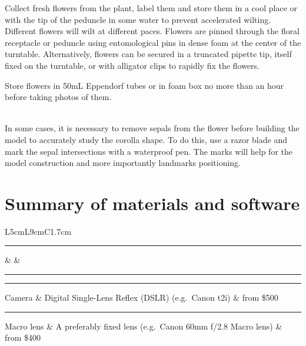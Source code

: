 \documentclass[
]{book}
\theoremstyle{definition}
\theoremstyle{definition}
\theoremstyle{definition}
\theoremstyle{definition}
\theoremstyle{remark}
\begin{document}
Collect fresh flowers from the plant, label them and store them in a
cool place or with the tip of the peduncle in some water to prevent
accelerated wilting. Different flowers will wilt at different paces.
Flowers are pinned through the floral receptacle or peduncle using
entomological pins in dense foam at the center of the turntable.
Alternatively, flowers can be secured in a truncated pipette tip, itself
fixed on the turntable, or with alligator clips to rapidly fix the
flowers.

Store flowers in 50mL Eppendorf tubes or in foam box no more than an
hour before taking photos of them.\\
\strut \\
In some cases, it is necessary to remove sepals from the flower before
building the model to accurately study the corolla shape. To do this,
use a razor blade and mark the sepal intersections with a waterproof
pen. The marks will help for the model construction and more importantly
landmarks positioning.

\hypertarget{summary-of-materials-and-software}{%
\section{Summary of materials and software}\label{summary-of-materials-and-software}}

L5cm\textbar L9cm\textbar C1.7cm

\begin{center}\rule{0.5\linewidth}{0.5pt}\end{center}

\& \&\\

\begin{center}\rule{0.5\linewidth}{0.5pt}\end{center}

\hfill\break

\begin{center}\rule{0.5\linewidth}{0.5pt}\end{center}

Camera \& Digital Single-Lens Reflex (DSLR) (e.g.~Canon t2i) \& from
\$500\\

\begin{center}\rule{0.5\linewidth}{0.5pt}\end{center}

Macro lens \& A preferably fixed lens (e.g.~Canon 60mm f/2.8 Macro lens)
\& from \$400\\
\end{document}
